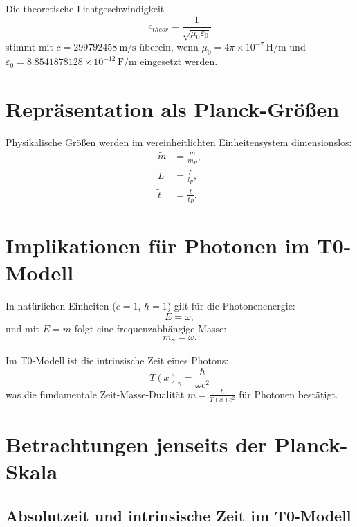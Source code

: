 \documentclass[12pt,a4paper]{article}
\newcommand{\Tfield}{T(x)}
\begin{document}
	Die theoretische Lichtgeschwindigkeit
	\begin{equation}
		c_{theor} = \frac{1}{\sqrt{\mu_0 \varepsilon_0}}
	\end{equation}
	stimmt mit \(c = \SI{299792458}{\meter\per\second}\) überein, wenn \(\mu_0 = 4\pi \times 10^{-7} \, \si{\henry\per\meter}\) und \(\varepsilon_0 = 8.8541878128 \times 10^{-12} \, \si{\farad\per\meter}\) eingesetzt werden.
	
	\section{Repräsentation als Planck-Größen}
	
	Physikalische Größen werden im vereinheitlichten Einheitensystem dimensionslos:
	\begin{align}
		\tilde{m} &= \frac{m}{m_P}, \\
		\tilde{L} &= \frac{L}{l_P}, \\
		\tilde{t} &= \frac{t}{t_P}.
	\end{align}
	
	\section{Implikationen für Photonen im T0-Modell}
	
	In natürlichen Einheiten (\(c = 1\), \(\hbar = 1\)) gilt für die Photonenenergie:
	\begin{equation}
		E = \omega,
	\end{equation}
	und mit \(E = m\) folgt eine frequenzabhängige Masse:
	\begin{equation}
		m_{\gamma} = \omega.
	\end{equation}
	
	Im T0-Modell ist die intrinsische Zeit eines Photons:
	\begin{equation}
		\Tfield_{\gamma} = \frac{\hbar}{\omega c^2}
	\end{equation}
	was die fundamentale Zeit-Masse-Dualität \(m = \frac{\hbar}{\Tfield c^2}\) für Photonen bestätigt.
	
	\section{Betrachtungen jenseits der Planck-Skala}
	
	\subsection{Absolutzeit und intrinsische Zeit im T0-Modell}
	
\end{document}
